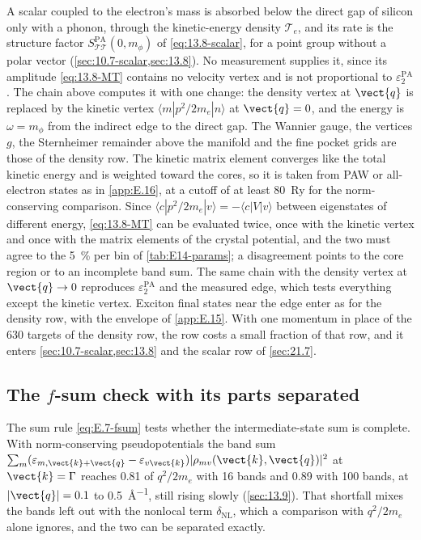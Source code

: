 A scalar coupled to the electron's mass is absorbed below the direct gap of silicon only with a phonon, through the kinetic-energy density $\mathcal{T}_e$, and its rate is the structure factor $S^{\mathrm{PA}}_{\mathcal{T}\mathcal{T}}(0,m_\phi)$ of \cref{eq:13.8-scalar}, for a point group without a polar vector (\cref{sec:10.7-scalar,sec:13.8}). No measurement supplies it, since its amplitude \cref{eq:13.8-MT} contains no velocity vertex and is not proportional to $\varepsilon_2^{\mathrm{PA}}$. The chain above computes it with one change: the density vertex at $\vect{q}$ is replaced by the kinetic vertex $\langle m|p^2/2m_e|n\rangle$ at $\vect{q} = 0$, and the energy is $\omega = m_\phi$ from the indirect edge to the direct gap. The Wannier gauge, the vertices $g$, the Sternheimer remainder above the manifold and the fine pocket grids are those of the density row. The kinetic matrix element converges like the total kinetic energy and is weighted toward the cores, so it is taken from PAW or all-electron states as in \cref{app:E.16}, at a cutoff of at least \SI{80}{Ry} for the norm-conserving comparison. Since $\langle c|p^2/2m_e|v\rangle = -\langle c|V|v\rangle$ between eigenstates of different energy, \cref{eq:13.8-MT} can be evaluated twice, once with the kinetic vertex and once with the matrix elements of the crystal potential, and the two must agree to the \SI{5}{\percent} per bin of \cref{tab:E14-params}; a disagreement points to the core region or to an incomplete band sum. The same chain with the density vertex at $\vect{q}\to0$ reproduces $\varepsilon_2^{\mathrm{PA}}$ and the measured edge, which tests everything except the kinetic vertex. Exciton final states near the edge enter as for the density row, with the envelope of \cref{app:E.15}. With one momentum in place of the 630 targets of the density row, the row costs a small fraction of that row, and it enters \cref{sec:10.7-scalar,sec:13.8} and the scalar row of \cref{sec:21.7}.

\subsection{The \texorpdfstring{$f$}{f}-sum check with its parts separated}

The sum rule \cref{eq:E.7-fsum} tests whether the intermediate-state sum is complete. With norm-conserving pseudopotentials the band sum $\sum_m(\varepsilon_{m,\vect{k}+\vect{q}} - \varepsilon_{v\vect{k}})|\rho_{mv}(\vect{k},\vect{q})|^2$ at $\vect{k} = \mathrm{\Gamma}$ reaches 0.81 of $q^2/2m_e$ with 16 bands and 0.89 with 100 bands, at $|\vect{q}| = 0.1$ to \SI{0.5}{\angstrom^{-1}}, still rising slowly (\cref{sec:13.9}). That shortfall mixes the bands left out with the nonlocal term $\delta_{\mathrm{NL}}$, which a comparison with $q^2/2m_e$ alone ignores, and the two can be separated exactly.

